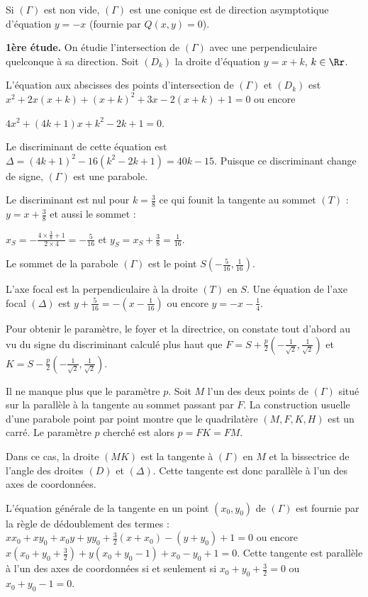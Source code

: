 {\begin{enumerate}
{Si $(\Gamma)$ est non vide, $(\Gamma)$ est une conique est de direction asymptotique d'équation $y = - x$ (fournie par $Q(x,y)= 0$).

\textbf{1ère étude.} On étudie l'intersection de $(\Gamma)$ avec une perpendiculaire quelconque à sa direction. Soit $(D_k)$ la droite d'équation $y = x+k$, $k\in\Rr$.

L'équation aux abscisses des points d'intersection de $(\Gamma)$ et $(D_k)$ est
$x^2+2x(x+k)+(x+k)^2+3x-2(x+k)+1=0$ ou encore 

\begin{center}
$4x^2+(4k+1)x+k^2-2k+1=0$.
\end{center}

Le discriminant de cette équation est $\Delta=(4k+1)^2-16(k^2-2k+1) = 40k-15$. Puisque ce discriminant change de signe, $(\Gamma)$ est une parabole.

Le discriminant est nul pour $k=\frac{3}{8}$ ce qui founit la tangente au sommet $(T)$ : $y=x+\frac{3}{8}$ et aussi le sommet :

\begin{center}
$x_S=-\frac{4\times\frac{3}{8}+1}{2\times4}= -\frac{5}{16}$  et $y_S =x_S+\frac{3}{8}=\frac{1}{16}$.
\end{center}

Le sommet de la parabole $(\Gamma)$ est le point $S\left(-\frac{5}{16},\frac{1}{16}\right)$.

L'axe focal est la perpendiculaire à la droite $(T)$ en $S$. Une équation de l'axe focal $(\Delta)$ est $y+\frac{5}{16}=-\left(x-\frac{1}{16}\right)$ ou encore $y = -x-\frac{1}{4}$.

Pour obtenir le paramètre, le foyer et la directrice, on constate tout d'abord au vu du signe du discriminant calculé plus haut que $F = S+\frac{p}{2}\left(-\frac{1}{\sqrt{2}},\frac{1}{\sqrt{2}}\right)$    et $K= S-\frac{p}{2}\left(-\frac{1}{\sqrt{2}},\frac{1}{\sqrt{2}}\right)$.

Il ne manque plus que le paramètre $p$. Soit $M$ l'un des deux points de $(\Gamma)$ situé sur la parallèle à la tangente au sommet passant par $F$. La construction usuelle d'une parabole point par point montre que le quadrilatère $(M,F,K,H)$ est un carré. Le paramètre $p$ cherché est alors $p=FK=FM$.

 
Dans ce cas, la droite $(MK)$ est la tangente à $(\Gamma)$ en $M$ et la bissectrice de l'angle des droites $(D)$ et $(\Delta)$. Cette tangente est donc parallèle à l'un des axes de coordonnées.

L'équation générale de la tangente en un point $(x_0,y_0)$ de $(\Gamma)$ est fournie par la règle de dédoublement des termes : $xx_0+xy_0+x_0y+yy_0+\frac{3}{2}(x+ x_0)-(y+y_0)+1=0$ ou encore $x\left(x_0+y_0+\frac{3}{2}\right)+y(x_0+y_0-1)+ x_0-y_0+1=0$. Cette tangente est parallèle à l'un des axes de coordonnées si et seulement si $x_0+y_0+\frac{3}{2}=0$ ou $x_0+y_0-1=0$.

}
\end{enumerate}}
